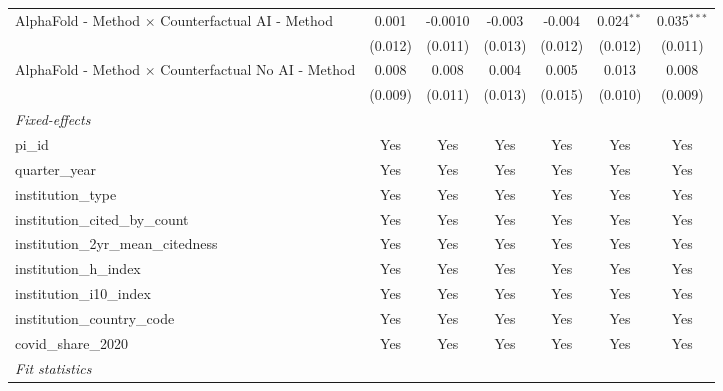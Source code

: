 \begin{tabular}{lcccccc}
   AlphaFold - Method $\times$ Counterfactual AI - Method      & 0.001         & -0.0010      & -0.003       & -0.004       & 0.024$^{**}$   & 0.035$^{***}$\\   
                                                               & (0.012)       & (0.011)      & (0.013)      & (0.012)      & (0.012)        & (0.011)\\   
   AlphaFold - Method $\times$ Counterfactual No AI - Method   & 0.008         & 0.008        & 0.004        & 0.005        & 0.013          & 0.008\\   
                                                               & (0.009)       & (0.011)      & (0.013)      & (0.015)      & (0.010)        & (0.009)\\   
   \midrule
   \emph{Fixed-effects}\\
   pi\_id                                                      & Yes           & Yes          & Yes          & Yes          & Yes            & Yes\\  
   quarter\_year                                               & Yes           & Yes          & Yes          & Yes          & Yes            & Yes\\  
   institution\_type                                           & Yes           & Yes          & Yes          & Yes          & Yes            & Yes\\  
   institution\_cited\_by\_count                               & Yes           & Yes          & Yes          & Yes          & Yes            & Yes\\  
   institution\_2yr\_mean\_citedness                           & Yes           & Yes          & Yes          & Yes          & Yes            & Yes\\  
   institution\_h\_index                                       & Yes           & Yes          & Yes          & Yes          & Yes            & Yes\\  
   institution\_i10\_index                                     & Yes           & Yes          & Yes          & Yes          & Yes            & Yes\\  
   institution\_country\_code                                  & Yes           & Yes          & Yes          & Yes          & Yes            & Yes\\  
   covid\_share\_2020                                          & Yes           & Yes          & Yes          & Yes          & Yes            & Yes\\  
   \midrule
   \emph{Fit statistics}\\

\end{tabular}
